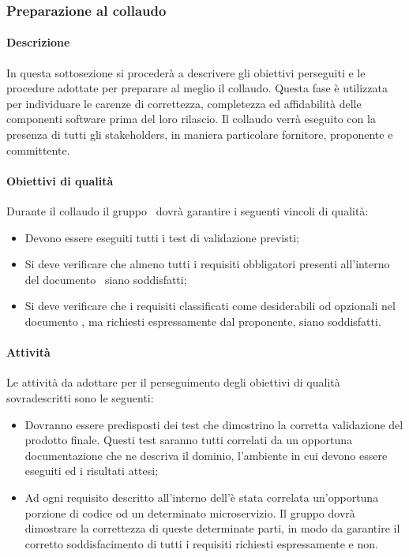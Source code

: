 \documentclass[../NormeDiProgetto_v4.0.0.tex]{subfiles}
\begin{document}
		\subsubsection{Preparazione al collaudo}
			\paragraph{Descrizione}
				In questa sottosezione si procederà a descrivere gli obiettivi perseguiti e le procedure adottate per preparare al meglio il collaudo. Questa fase è utilizzata per individuare le carenze di correttezza, completezza ed affidabilità delle componenti software prima del loro rilascio. Il collaudo verrà eseguito con la presenza di tutti gli stakeholders, in maniera particolare fornitore, proponente e committente.
			\paragraph{Obiettivi di qualità}
				Durante il collaudo il gruppo \kpanic\ dovrà garantire i seguenti vincoli di qualità: 
				\begin{itemize}
					\item Devono essere eseguiti tutti i test di validazione previsti;
					\item Si deve verificare che almeno tutti i requisiti obbligatori presenti all'interno del documento \analisideirequisitiRA\ siano soddisfatti;
					\item Si deve verificare che i requisiti classificati come desiderabili od opzionali nel documento \analisideirequisitiRA, ma richiesti espressamente dal proponente, siano soddisfatti.
				\end{itemize}
	
			\paragraph{Attività}
				Le attività da adottare per il perseguimento degli obiettivi di qualità sovradescritti sono le seguenti:
				\begin{itemize}
					\item Dovranno essere predisposti dei test che dimostrino la corretta validazione del prodotto finale. Questi test saranno tutti correlati da un opportuna documentazione che ne descriva il dominio, l'ambiente in cui devono essere eseguiti ed i risultati attesi;
					\item Ad ogni requisito descritto all'interno dell'\analisideirequisitiRA è stata correlata un'opportuna porzione di codice od un determinato microservizio. Il gruppo \kpanic dovrà dimostrare la correttezza di queste determinate parti, in modo da garantire il corretto soddisfacimento di tutti i requisiti richiesti espressamente e non.
				\end{itemize}
	
\end{document}
